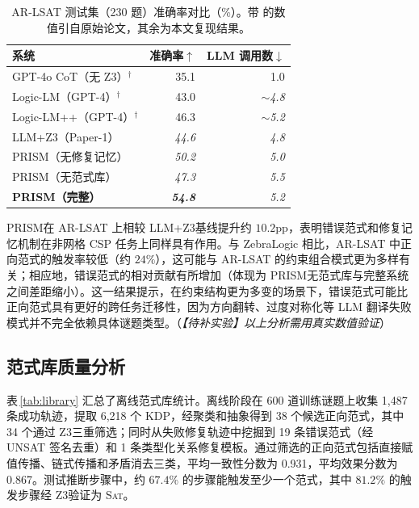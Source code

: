 \documentclass[UTF8,a4paper,12pt]{ctexart}
\newcommand{\PRISM}{PRISM}
\newcommand{\sat}{\textsc{Sat}}
\newcommand{\zthree}{Z3}
\begin{document}
\begin{table}[t]
  \centering
  \caption{AR-LSAT 测试集（230 题）准确率对比（\%）。带 \dag 的数值引自原始论文，其余为本文复现结果。}
  \label{tab:arlsat}
  \begin{tabular}{lrr}
    \toprule
    系统 & 准确率\(\uparrow\) & LLM 调用数\(\downarrow\) \\
    \midrule
    GPT-4o CoT（无 \zthree）$^\dag$ & 35.1 & 1.0 \\
    Logic-LM（GPT-4）$^\dag$ & 43.0 & \textit{$\sim$4.8} \\
    Logic-LM++（GPT-4）$^\dag$ & 46.3 & \textit{$\sim$5.2} \\
    LLM+\zthree（Paper-1） & \textit{44.6} & \textit{4.8} \\
    \PRISM（无修复记忆） & \textit{50.2} & \textit{5.0} \\
    \PRISM（无范式库） & \textit{47.3} & \textit{5.5} \\
    \textbf{\PRISM（完整）} & \textbf{\textit{54.8}} & \textit{5.2} \\
    \bottomrule
  \end{tabular}
\end{table}

\PRISM 在 AR-LSAT 上相较 LLM+\zthree 基线提升约 \(10.2\)pp，表明错误范式和修复记忆机制在非网格 CSP 任务上同样具有作用。与 ZebraLogic 相比，AR-LSAT 中正向范式的触发率较低（约 \(24\%\)），这可能与 AR-LSAT 的约束组合模式更为多样有关；相应地，错误范式的相对贡献有所增加（体现为 \PRISM 无范式库与完整系统之间差距缩小）。这一结果提示，在约束结构更为多变的场景下，错误范式可能比正向范式具有更好的跨任务迁移性，因为方向翻转、过度对称化等 LLM 翻译失败模式并不完全依赖具体谜题类型。（\textit{【待补实验】以上分析需用真实数值验证}）

\subsection{范式库质量分析}

表\,\ref{tab:library} 汇总了离线范式库统计。离线阶段在 600 道训练谜题上收集 1,487 条成功轨迹，提取 6,218 个 KDP，经聚类和抽象得到 38 个候选正向范式，其中 34 个通过 \zthree 三重筛选；同时从失败修复轨迹中挖掘到 19 条错误范式（经 UNSAT 签名去重）和 1 条类型化关系修复模板。通过筛选的正向范式包括直接赋值传播、链式传播和矛盾消去三类，平均一致性分数为 0.931，平均效果分数为 0.867。测试推断步骤中，约 \(67.4\%\) 的步骤能触发至少一个范式，其中 \(81.2\%\) 的触发步骤经 \zthree 验证为 \sat。
\end{document}
